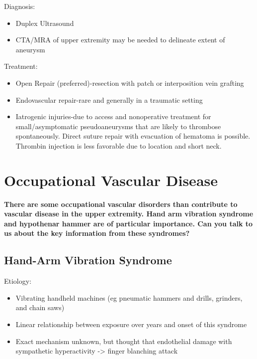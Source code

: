 \documentclass[
]{book}
\begin{document}
Diagnosis:~

\begin{itemize}
\item
  Duplex Ultrasound
\item
  CTA/MRA of upper extremity may be needed to delineate extent of
  aneurysm~
\end{itemize}

Treatment:~

\begin{itemize}
\item
  Open Repair (preferred)-resection with patch or interposition vein
  grafting~~
\item
  Endovascular repair-rare and generally in a traumatic setting
\item
  Iatrogenic injuries-due to access and nonoperative treatment for
  small/asymptomatic pseudoaneurysms that are likely to thrombose
  spontaneously. Direct suture repair with evacuation of hematoma is
  possible. Thrombin injection is less favorable due to location and
  short neck.~
\end{itemize}

\hypertarget{occupational-vascular-disease}{%
\section{Occupational Vascular Disease}\label{occupational-vascular-disease}}

\textbf{There are some occupational vascular disorders than contribute to
vascular disease in the upper extremity. Hand arm vibration syndrome and
hypothenar hammer are of particular importance. Can you talk to us about
the key information from these syndromes?}
\citet{eskandari185ConditionsArising2020}

\hypertarget{hand-arm-vibration-syndrome}{%
\subsection{Hand-Arm Vibration Syndrome~}\label{hand-arm-vibration-syndrome}}

Etiology:

\begin{itemize}
\item
  Vibrating handheld machines (eg pneumatic hammers and drills,
  grinders, and chain saws)~
\item
  Linear relationship between exposure over years and onset of this
  syndrome~
\item
  Exact mechanism unknown, but thought that endothelial damage with
  sympathetic hyperactivity -\textgreater{} finger blanching attack~
\end{itemize}
\end{document}
